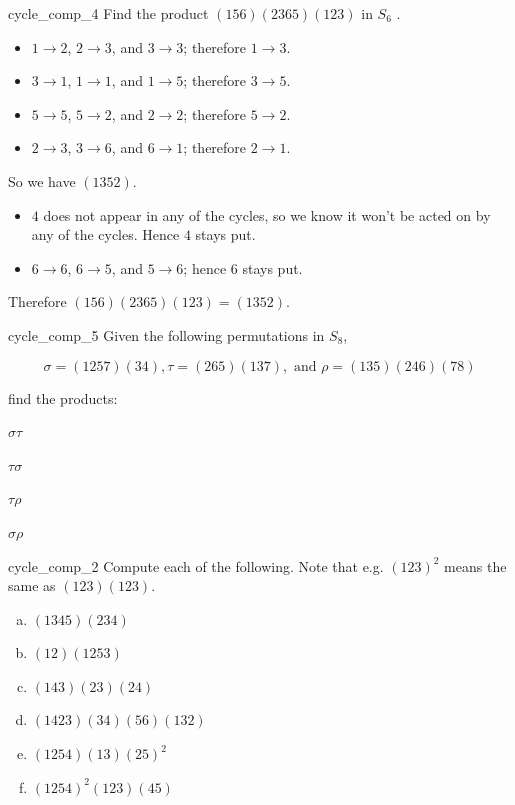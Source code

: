 \begin{example}{cycle_comp_4}
Find the product $(156)(2365)(123)$  in $S_6$ .
\begin{itemize}
\item
$1 \to 2$, $2 \to 3$, and $3 \to 3$; therefore $1 \to 3$.
\item
$3 \to 1$, $1 \to 1$, and $1 \to 5$; therefore $3 \to 5$.
\item
$5 \to 5$, $5 \to 2$, and $2 \to 2$; therefore $5 \to 2$.
\item
$2 \to 3$, $3 \to 6$, and $6 \to 1$; therefore $2 \to 1$.
\end{itemize}

\noindent
So we have $(1352)$.

\begin{itemize}
\item
$4$ does not appear in any of the cycles, so we know it won't be acted on by any of the cycles.  Hence $4$ stays put.
\item
$6 \to 6$, $6 \to 5$, and $5 \to 6$; hence $6$ stays put.
\end{itemize}

\noindent
Therefore $(156)(2365)(123) = (1352)$.
\end{example}

\begin{exercise}{cycle_comp_5}
Given the following permutations in $S_8$, 

\[  \sigma = (1257)(34) , \tau = (265)(137), \text { and } \rho = (135)(246)(78) \]

\noindent
find the products:
\begin{enumerate}[(a)]
\begin{multicols}{2}
\item
$\sigma \tau$
\item
$\tau \sigma$
\item
$\tau \rho$
\item
$\sigma \rho$
\end{multicols}
\end{enumerate}
\end{exercise}



\begin{exercise}{cycle_comp_2}
Compute each of the following. Note that e.g. $(123)^2$ means the same as $(123)(123)$.
\begin{multicols}{3}
\begin{enumerate}[(a)]
 \item
$(1345)(234)$
\item
$(12)(1253)$
\item
$(143)(23)(24)$
\item
$(1423)(34)(56)(132)$
\item
$(1254)(13)(25)^2$
\item
$(1254)^2 (123)(45)$
\end{enumerate}
\end{multicols}
\end{exercise}



